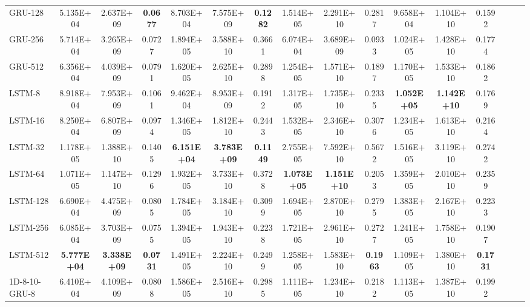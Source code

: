 \begin{landscape}
\begin{longtable}{|l|c|c|c|c|c|c|c|c|c|c|c|c|c|c|c|}
    GRU-128 & 5.135E+04 & 2.637E+09 & \cellcolor[rgb]{ .573,  .816,  .314}\textbf{0.0677} & 8.703E+04 & 7.575E+09 & \cellcolor[rgb]{ .573,  .816,  .314}\textbf{0.1282} & 1.514E+05 & 2.291E+10 & 0.2817 & 9.658E+04 & 1.104E+10 & 0.1592 \\
    GRU-256 & 5.714E+04 & 3.265E+09 & 0.0727 & 1.894E+05 & 3.588E+10 & 0.3661 & 6.074E+04 & 3.689E+09 & 0.0933 & 1.024E+05 & 1.428E+10 & 0.1774 \\
    GRU-512 & 6.356E+04 & 4.039E+09 & 0.0791 & 1.620E+05 & 2.625E+10 & 0.2898 & 1.254E+05 & 1.571E+10 & 0.1897 & 1.170E+05 & 1.533E+10 & 0.1862 \\
    \midrule
    LSTM-8 & 8.918E+04 & 7.953E+09 & 0.1061 & 9.462E+04 & 8.953E+09 & 0.1912 & 1.317E+05 & 1.735E+10 & 0.2335 & \cellcolor[rgb]{ .573,  .816,  .314}\textbf{1.052E+05} & \cellcolor[rgb]{ .573,  .816,  .314}\textbf{1.142E+10} & 0.1769 \\
    LSTM-16 & 8.250E+04 & 6.807E+09 & 0.0974 & 1.346E+05 & 1.812E+10 & 0.2443 & 1.532E+05 & 2.346E+10 & 0.3076 & 1.234E+05 & 1.613E+10 & 0.2164 \\
    LSTM-32 & 1.178E+05 & 1.388E+10 & 0.1405 & \cellcolor[rgb]{ .573,  .816,  .314}\textbf{6.151E+04} & \cellcolor[rgb]{ .573,  .816,  .314}\textbf{3.783E+09} & \cellcolor[rgb]{ .573,  .816,  .314}\textbf{0.1149} & 2.755E+05 & 7.592E+10 & 0.5672 & 1.516E+05 & 3.119E+10 & 0.2742 \\
    LSTM-64 & 1.071E+05 & 1.147E+10 & 0.1296 & 1.932E+05 & 3.733E+10 & 0.3728 & \cellcolor[rgb]{ .573,  .816,  .314}\textbf{1.073E+05} & \cellcolor[rgb]{ .573,  .816,  .314}\textbf{1.151E+10} & 0.2053 & 1.359E+05 & 2.010E+10 & 0.2359 \\
    LSTM-128 & 6.690E+04 & 4.475E+09 & 0.0805 & 1.784E+05 & 3.184E+10 & 0.3099 & 1.694E+05 & 2.870E+10 & 0.2795 & 1.383E+05 & 2.167E+10 & 0.2233 \\
    LSTM-256 & 6.085E+04 & 3.703E+09 & 0.0755 & 1.394E+05 & 1.943E+10 & 0.2238 & 1.721E+05 & 2.961E+10 & 0.2727 & 1.241E+05 & 1.758E+10 & 0.1907 \\
    LSTM-512 & \cellcolor[rgb]{ .573,  .816,  .314}\textbf{5.777E+04} & \cellcolor[rgb]{ .573,  .816,  .314}\textbf{3.338E+09} & \cellcolor[rgb]{ .573,  .816,  .314}\textbf{0.0731} & 1.491E+05 & 2.224E+10 & 0.2499 & 1.258E+05 & 1.583E+10 & \cellcolor[rgb]{ .573,  .816,  .314}\textbf{0.1963} & 1.109E+05 & 1.380E+10 & \cellcolor[rgb]{ .573,  .816,  .314}\textbf{0.1731} \\
    \midrule
    1D-8-10-GRU-8 & 6.410E+04 & 4.109E+09 & 0.0808 & 1.586E+05 & 2.516E+10 & 0.2985 & 1.111E+05 & 1.234E+10 & 0.2182 & 1.113E+05 & 1.387E+10 & 0.1992 \\

\end{longtable}
\end{landscape}
